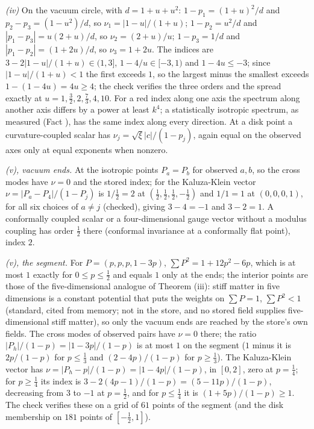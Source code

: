 \emph{(iv)} On the vacuum circle, with $d = 1 + u + u^{2}$: $1 - p_{1} = (1 + u)^{2}/d$ and $p_{2} - p_{3} = (1 - u^{2})/d$, so $\nu_{1} = |1 - u|/(1 + u)$; $1 - p_{2} = u^{2}/d$ and $|p_{1} - p_{3}| = u(2 + u)/d$, so $\nu_{2} = (2 + u)/u$; $1 - p_{3} = 1/d$ and $|p_{1} - p_{2}| = (1 + 2u)/d$, so $\nu_{3} = 1 + 2u$. The indices are $3 - 2|1 - u|/(1 + u) \in (1, 3]$, $1 - 4/u \in [-3, 1)$ and $1 - 4u \le -3$; since $|1 - u|/(1 + u) < 1$ the first exceeds $1$, so the largest minus the smallest exceeds $1 - (1 - 4u) = 4u \ge 4$; the check verifies the three orders and the spread exactly at $u = 1, \tfrac32, 2, \tfrac73, 4, 10$. For a red index along one axis the spectrum along another axis differs by a power at least $k^{4}$; a statistically isotropic spectrum, as measured (Fact ), has the same index along every direction. At a disk point a curvature-coupled scalar has $\nu_{j} = \sqrt{\xi}|c|/(1 - p_{j})$, again equal on the observed axes only at equal exponents when nonzero.

\emph{(v), vacuum ends.} At the isotropic points $P_{a} = P_{b}$ for observed $a, b$, so the cross modes have $\nu = 0$ and the stored index; for the Kaluza-Klein vector $\nu = |P_{a} - P_{4}|/(1 - P_{j})$ is $1/\tfrac12 = 2$ at $(\tfrac12, \tfrac12, \tfrac12, -\tfrac12)$ and $1/1 = 1$ at $(0, 0, 0, 1)$, for all six choices of $a \ne j$ (checked), giving $3 - 4 = -1$ and $3 - 2 = 1$. A conformally coupled scalar or a four-dimensional gauge vector without a modulus coupling has order $\tfrac12$ there (conformal invariance at a conformally flat point), index $2$.

\emph{(v), the segment.} For $P = (p, p, p, 1 - 3p)$, $\sum P^{2} = 1 + 12p^{2} - 6p$, which is at most $1$ exactly for $0 \le p \le \tfrac12$ and equals $1$ only at the ends; the interior points are those of the five-dimensional analogue of Theorem (iii): stiff matter in five dimensions is a constant potential that puts the weights on $\sum P = 1$, $\sum P^{2} < 1$ (standard, cited from memory; not in the store, and no stored field supplies five-dimensional stiff matter), so only the vacuum ends are reached by the store's own fields. The cross modes of observed pairs have $\nu = 0$ there; the ratio $|P_{h}|/(1 - p) = |1 - 3p|/(1 - p)$ is at most $1$ on the segment ($1$ minus it is $2p/(1 - p)$ for $p \le \tfrac13$ and $(2 - 4p)/(1 - p)$ for $p \ge \tfrac13$). The Kaluza-Klein vector has $\nu = |P_{h} - p|/(1 - p) = |1 - 4p|/(1 - p)$, in $[0, 2]$, zero at $p = \tfrac14$; for $p \ge \tfrac14$ its index is $3 - 2(4p - 1)/(1 - p) = (5 - 11p)/(1 - p)$, decreasing from $3$ to $-1$ at $p = \tfrac12$, and for $p \le \tfrac14$ it is $(1 + 5p)/(1 - p) \ge 1$. The check verifies these on a grid of $61$ points of the segment (and the disk membership on $181$ points of $[-\tfrac12, 1]$).

